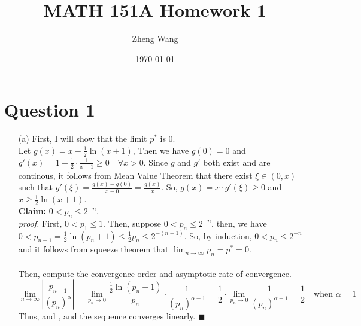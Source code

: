 \documentclass[11pt]{article}
\author{Zheng Wang}
\date{\today}
\title{MATH 151A Homework 1}
\newcommand*{\boxtex}[1]{\framebox{#1}}
\begin{document}
\maketitle

\section*{Question 1}
\begin{itemize}
	\item [(a)]
	First, I will show that the limit $ p^* $ is $ 0 $.\\
	Let $ g(x) = x - \frac{1}{2}\ln(x+1) $, Then we have $ g(0) = 0 $ and $ g'(x)= 1-\frac{1}{2}\cdot \frac{1}{x+1} \ge 0 \quad \forall x > 0 $. Since $ g $ and $ g' $ both exist and are continous, it follows from Mean Value Theorem that there exist $ \xi \in (0,x) $ such that $ g'(\xi) = \frac{g(x)-g(0)}{x-0} = \frac{g(x)}{x}$.
	So, $g(x) = x\cdot g'(\xi) \ge 0 $ and $ x \ge \frac{1}{2}\ln (x+1) $.\\
	\textbf{Claim:} $ 0 < p_n \le 2^{-n} $.\\
	\textit{proof.} First, $ 0 < p_1 \le 1 $. Then, suppose $ 0 < p_n \le 2^{-n} $, then, we have $ 0 < p_{n+1} = \frac{1}{2}\ln(p_n+1) \le \frac{1}{2}p_n \le 2^{-(n+1)} $. So, by induction, $ 0 < p_n \le 2^{-n} $ and it follows from squeeze theorem that $ \lim_{n \rightarrow \infty} p_n = p^* = 0 $.\\\\
	Then, compute the convergence order and asymptotic rate of convergence. 
	\[ \lim_{n\rightarrow \infty} \left| \frac{p_{n+1}}{(p_n)^\alpha} \right| = \lim_{p_n \rightarrow 0} \frac{\frac{1}{2}\ln(p_n + 1)}{p_n} \cdot \frac{1}{(p_n)^{\alpha -1}} = \frac{1}{2} \cdot \lim_{p_n \rightarrow 0} \frac{1}{(p_n)^{\alpha -1}} = \frac{1}{2} \quad\text{when } \alpha = 1 \]
	Thus, \boxtex{$ \alpha = 1 $} and \boxtex{$ \lambda = \frac{1}{2} $}, and the sequence converges linearly. \hfill $ \blacksquare $
	

\end{itemize}
\end{document}
